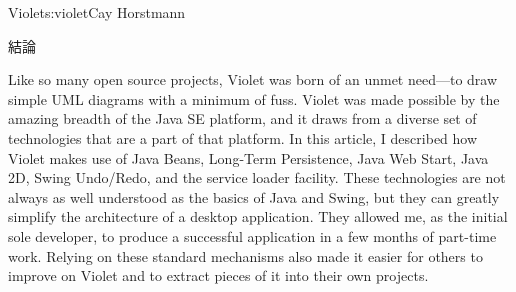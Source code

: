 \begin{aosachapter}{Violet}{s:violet}{Cay Horstmann}
\begin{aosasect1}{結論}

Like so many open source projects, Violet was born of an unmet
need---to draw simple UML diagrams with a minimum of fuss. Violet was
made possible by the amazing breadth of the Java SE platform, and it
draws from a diverse set of technologies that are a part of that
platform. In this article, I described how Violet makes use of Java
Beans, Long-Term Persistence, Java Web Start, Java 2D, Swing
Undo/Redo, and the service loader facility.  These technologies are
not always as well understood as the basics of Java and Swing, but
they can greatly simplify the architecture of a desktop
application. They allowed me, as the initial sole developer, to
produce a successful application in a few months of part-time work.
Relying on these standard mechanisms also made it easier for others to
improve on Violet and to extract pieces of it into their own projects.

\end{aosasect1}

\end{aosachapter}
